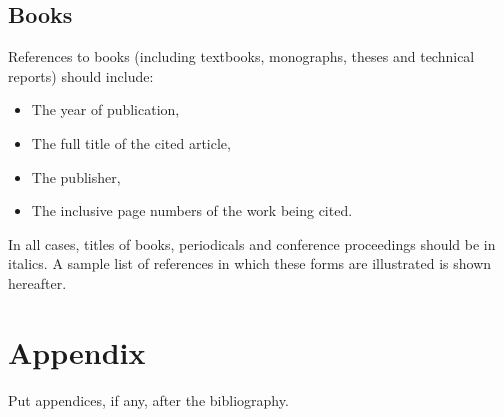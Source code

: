 \documentclass[bibtex,pagenumbers]{stabs2021}
\begin{document}
\subsection{Books}

References to books (including textbooks, monographs, theses and
technical reports) should include:
\begin{itemize}
  \item The year of publication,
  \item The full title of the cited article,
  \item The publisher,
  \item The inclusive page numbers of the work being cited.
\end{itemize}

In all cases, titles of books, periodicals and conference proceedings
should be in italics. A sample list of references in which these forms
are illustrated is shown hereafter.




\appendix

\section{Appendix}

Put appendices, if any, after the bibliography.
\end{document}
